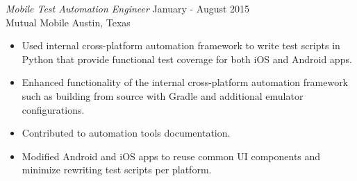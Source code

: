 \documentclass[line,margin]{res}
\begin{document}
\begin{resume}
\begin{itemize}




    \end{itemize}

    {\sl Mobile Test Automation Engineer } \hfill January - August 2015 \\
    { Mutual Mobile } \hfill Austin, Texas \\
    \begin{itemize} \itemsep -2pt
        \item \small Used internal cross-platform automation framework to write test scripts in Python that provide functional test coverage for both iOS and Android apps.
        \item \small Enhanced functionality of the internal cross-platform automation framework such as building from source with Gradle and additional emulator configurations.
        \item \small Contributed to automation tools documentation.
        \item \small Modified Android and iOS apps to reuse common UI components and minimize rewriting test scripts per platform.
    \end{itemize}


\end{resume}
\end{document}
